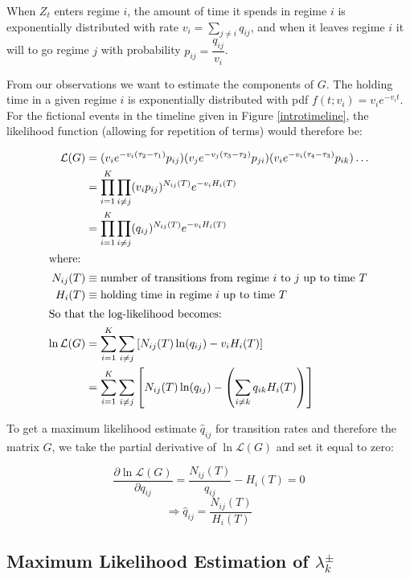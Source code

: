 When $Z_t$ enters regime $i$, the amount of time it spends in regime $i$ is exponentially distributed with rate $v_i = \sum\limits_{j \neq i} q_{ij}$, and when it leaves regime $i$ it will to go regime $j$ with probability $p_{ij} = \dfrac{q_{ij}}{v_i}$. 

From our observations we want to estimate the components of $G$. The holding time in a given regime $i$ is exponentially distributed with pdf $f(t;v_i) = v_i e^{-v_i t}$. For the fictional events in the timeline given in Figure \ref{introtimeline}, the likelihood function (allowing for repetition of terms) would therefore be:

\begin{align}
\mathcal{L}(G) &= (v_{i} e^{-v_{i}(\tau_2 - \tau_1)} p_{ij}) (v_{j} e^{-v_{j}(\tau_3 - \tau_2)} p_{ji}) (v_{i} e^{-v_{i}(\tau_4 - \tau_3)} p_{ik}) \dots \\
&= \prod\limits_{i=1}^{K} \prod\limits_{i \neq j} (v_{i}p_{ij})^{N_{ij}(T)} e^{-v_{i}H_i(T)} \\
&= \prod\limits_{i=1}^{K} \prod\limits_{i \neq j} (q_{ij})^{N_{ij}(T)} e^{-v_{i}H_i(T)} \\
\intertext{where:}
N_{ij}(T) & \equiv \mbox{number of transitions from regime $i$ to $j$ up to time $T$} \nonumber \\
H_{i}(T) & \equiv \mbox{holding time in regime $i$ up to time $T$} \nonumber \\
\intertext{So that the log-likelihood becomes:} 
\ln \mathcal{L}(G) & = \sum\limits_{i=1}^{K} \sum\limits_{i \neq j} \left[ N_{ij}(T) \ln(q_{ij}) - v_{i} H_i(T) \right] \\
&= \sum\limits_{i=1}^{K} \sum\limits_{i \neq j} \left[ N_{ij}(T) \ln(q_{ij}) - \left( \sum\limits_{i \neq k} q_{ik} H_i(T) \right) \right]
\end{align}

To get a maximum likelihood estimate $\hat{q}_{ij}$ for transition rates and therefore the matrix $G$, we take the partial derivative of $\ln \mathcal{L}(G)$ and set it equal to zero:

\begin{equation}
\dfrac{\partial \ln \mathcal{L}(G)}{\partial q_{ij}} = \dfrac{N_{ij}(T)}{q_{ij}} - H_i(T) = 0
\end{equation}
\begin{equation}
\Rightarrow \boxed{ \hat{q}_{ij} = \dfrac{N_{ij}(T)}{H_i(T)} }
\end{equation}

\subsection{Maximum Likelihood Estimation of \texorpdfstring{$\lambda^{\pm}_k$}{lpmk}}

